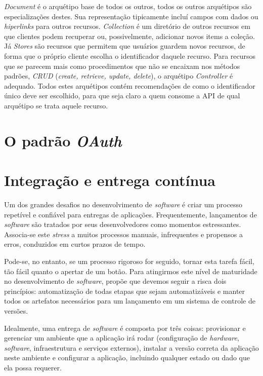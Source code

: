 \emph{Document} é o arquétipo base de todos os outros, todos os outros arquétipos são especializações 
destes. Sua representação tipicamente incluí campos com dados ou \emph{hiperlinks} para outros 
recursos. \emph{Collection} é um diretório de outros recursos em que clientes podem recuperar 
ou, possivelmente, adicionar novos items a coleção. Já \emph{Stores} são recursos que permitem 
que usuários guardem novos recursos, de forma que o próprio cliente escolha o 
identificador daquele recurso. Para recursos que se parecem mais como procedimentos que 
não se encaixam nos métodos padrões, \emph{CRUD} (\emph{create, retrieve, update, delete}),
  o arquétipo \emph{Controller} é adequado. Todos estes arquétipos 
  contém recomendações de como o identificador único deve ser escolhido, para que seja 
  claro a quem consome a API de qual arquétipo se trata aquele recurso.

  \section{O padrão \emph{OAuth}}

  

  \section{Integração e entrega contínua}
  Um dos grandes desafios no desenvolvimento de \emph{software} é criar um processo repetível e 
  confiável para entregas de aplicações. Frequentemente, lançamentos de \emph{software} são
  tratados por seus desenvolvedores como momentos estressantes. Associa-se este \emph{stress} a
  muitos processos manuais, infrequentes e propensos a erros, conduzidos em curtos prazos 
  de tempo.
  
  Pode-se, no entanto, se um processo rigoroso for seguido,  
  tornar esta tarefa fácil, tão fácil quanto o apertar de um botão.
  Para atingirmos este nível de maturidade no desenvolvimento de 
  \emph{software},  propõe que
  devemos seguir a risca dois princípios: automatização de todas etapas que sejam 
  automatizáveis e manter todos os artefatos necessários para um lançamento em um sistema de 
  controle de versões. 

  Idealmente, uma entrega de \emph{software} é composta por três coisas: 
  provisionar e gerenciar um ambiente que a aplicação irá rodar (configuração de \emph{hardware},
  \emph{software}, infraestrutura e serviços externos), instalar a versão correta da aplicação 
  neste ambiente e configurar a aplicação, incluindo qualquer estado ou dado que ela possa requerer.

